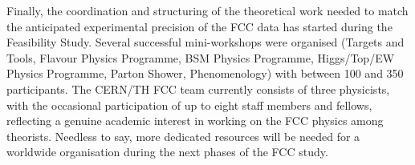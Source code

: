 Finally, the coordination and structuring of the theoretical work needed to match the anticipated experimental precision of the FCC data has started during the Feasibility Study. 
Several successful mini-workshops were organised (Targets and Tools, Flavour Physics Programme, BSM Physics Programme, Higgs/Top/EW Physics Programme, Parton Shower, Phenomenology) with between 100 and 350 participants. 
The CERN/TH FCC team currently consists of three physicists, with the occasional participation of up to eight staff members and fellows, reflecting a genuine academic interest in working on the FCC physics among theorists. 
Needless to say, more dedicated resources will be needed for a worldwide organisation during the next phases of the FCC study. 